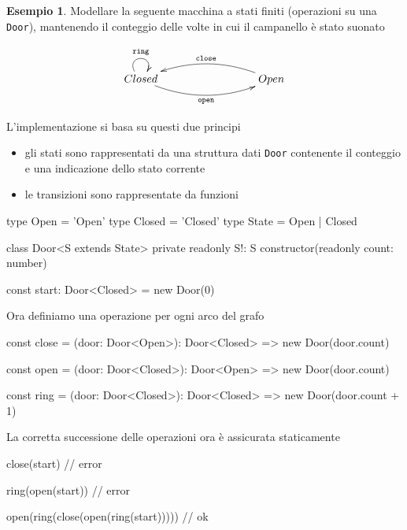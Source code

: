 \documentclass[12pt]{article}
\theoremstyle{definition}
\newtheorem{example}{Esempio}[subsection]
\newenvironment{code}
  {\vspace{0.5cm} \VerbatimEnvironment\begin{typescriptcode}}
  {\end{typescriptcode} \vspace{0.2cm}}
\begin{document}
\begin{example}
Modellare la seguente macchina a stati finiti (operazioni su una \texttt{Door}), mantenendo il conteggio delle
volte in cui il campanello è stato suonato

\[
\xymatrixrowsep{3cm}
\xymatrixcolsep{3cm}
\xymatrix{
  Closed \ar@/_0.5cm/[r]_{\texttt{open}} \ar@(ul,ur)^{\texttt{ring}} & Open \ar@/_0.5cm/[l]_{\texttt{close}} \\
}
\]

L'implementazione si basa su questi due principi

\begin{itemize}
\item gli stati sono rappresentati da una struttura dati \texttt{Door} contenente il conteggio e una indicazione dello stato corrente
\item le transizioni sono rappresentate da funzioni
\end{itemize}

\begin{code}
type Open = 'Open'
type Closed = 'Closed'
type State = Open | Closed

class Door<S extends State> {
  private readonly S!: S
  constructor(readonly count: number) {}
}

const start: Door<Closed> = new Door(0)
\end{code}

Ora definiamo una operazione per ogni arco del grafo

\begin{code}
const close = (door: Door<Open>): Door<Closed> =>
  new Door(door.count)

const open = (door: Door<Closed>): Door<Open> =>
  new Door(door.count)

const ring = (door: Door<Closed>): Door<Closed> =>
  new Door(door.count + 1)
\end{code}

La corretta successione delle operazioni ora è assicurata staticamente

\begin{code}
close(start) // error

ring(open(start)) // error

open(ring(close(open(ring(start))))) // ok
\end{code}
\end{example}
\end{document}
